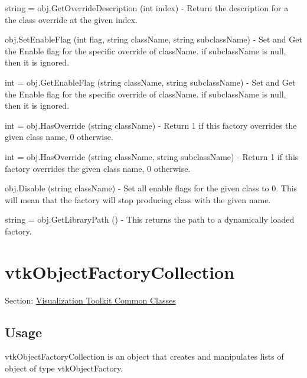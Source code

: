 \begin{DoxyItemize}
\item {\ttfamily string = obj.\-Get\-Override\-Description (int index)} -\/ Return the description for a the class override at the given index.  
\item {\ttfamily obj.\-Set\-Enable\-Flag (int flag, string class\-Name, string subclass\-Name)} -\/ Set and Get the Enable flag for the specific override of class\-Name. if subclass\-Name is null, then it is ignored.  
\item {\ttfamily int = obj.\-Get\-Enable\-Flag (string class\-Name, string subclass\-Name)} -\/ Set and Get the Enable flag for the specific override of class\-Name. if subclass\-Name is null, then it is ignored.  
\item {\ttfamily int = obj.\-Has\-Override (string class\-Name)} -\/ Return 1 if this factory overrides the given class name, 0 otherwise.  
\item {\ttfamily int = obj.\-Has\-Override (string class\-Name, string subclass\-Name)} -\/ Return 1 if this factory overrides the given class name, 0 otherwise.  
\item {\ttfamily obj.\-Disable (string class\-Name)} -\/ Set all enable flags for the given class to 0. This will mean that the factory will stop producing class with the given name.  
\item {\ttfamily string = obj.\-Get\-Library\-Path ()} -\/ This returns the path to a dynamically loaded factory.  
\end{DoxyItemize}\hypertarget{vtkcommon_vtkobjectfactorycollection}{}\section{vtk\-Object\-Factory\-Collection}\label{vtkcommon_vtkobjectfactorycollection}
Section\-: \hyperlink{sec_vtkcommon}{Visualization Toolkit Common Classes} \hypertarget{vtkwidgets_vtkxyplotwidget_Usage}{}\subsection{Usage}\label{vtkwidgets_vtkxyplotwidget_Usage}
vtk\-Object\-Factory\-Collection is an object that creates and manipulates lists of object of type vtk\-Object\-Factory.

